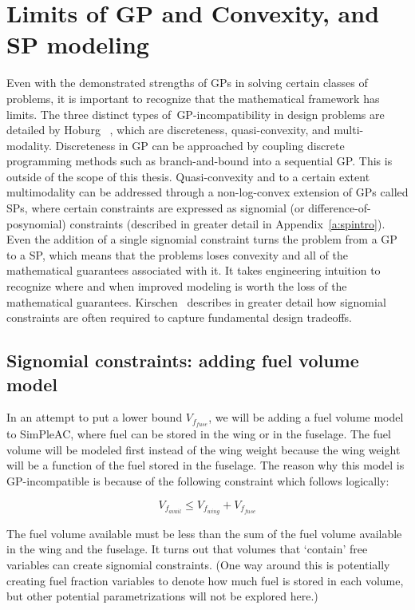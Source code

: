 \section{Limits of GP and Convexity, and SP modeling}
\label{s:GPlimits}

Even with the demonstrated strengths of \gls{GP}s in solving certain classes of
problems, it is important to recognize that the mathematical framework has limits.
The three distinct types of~\gls{GP}-incompatibility in design problems are detailed
by Hoburg~ \cite{hoburg_thesis}, which are discreteness,
quasi-convexity, and multi-modality. Discreteness in \gls{GP} can be approached
by coupling discrete programming methods such as branch-and-bound into a sequential
\gls{GP}. This is outside of the scope of this thesis.
Quasi-convexity and to a certain extent multimodality can
be addressed through a non-log-convex extension of \gls{GP}s called \gls{SP}s, where
certain constraints are expressed as signomial (or difference-of-posynomial) constraints
(described in greater detail in Appendix~\ref{a:spintro}).
Even the addition of a single
signomial constraint turns the problem from a \gls{GP} to a \gls{SP}, which means
that the problems loses convexity and all of the mathematical guarantees associated with it. 
It takes engineering intuition to recognize where and when improved modeling is worth
the loss of the mathematical guarantees. Kirschen~\cite{kirschen_thesis} describes in greater
detail how
signomial constraints are often required to capture fundamental design tradeoffs.

\subsection{Signomial constraints: adding fuel volume model}
\label{s:fuel}

In an attempt to put a lower bound $V_{f_{fuse}}$, we will
be adding a fuel volume model to SimPleAC, where fuel can be stored in the wing or
in the fuselage. The fuel volume will be modeled first instead of the wing
weight because the wing weight will be a function of the fuel stored in the fuselage.
The reason why this model is \gls{GP}-incompatible is because of the
following constraint which follows logically:

\begin{equation}
	V_{f_{avail}} \leq V_{f_{wing}} + V_{f_{fuse}}
	\label{vfavail}
\end{equation}

The fuel volume available must be less than the sum of the fuel volume available in the
wing and the fuselage. It turns out that volumes that `contain' free variables
can create signomial constraints. (One way around this is potentially creating fuel
fraction variables to denote how much fuel is stored in each volume, but
other potential parametrizations will not be explored here.)

